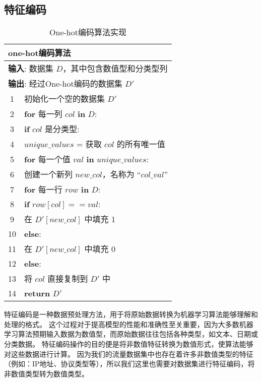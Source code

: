 \subsection{特征编码}
\begin{table}[htbp]
  \caption{One-hot编码算法实现}
  \label{tab:onehot}
  \centering
  \begin{tabularx}{1.0\textwidth}{cl}
  \toprule
  \multicolumn{2}{l}{\textbf{one-hot编码算法}}\\
  \midrule
  \multicolumn{2}{l}{\textbf{输入}: 数据集 $D$，其中包含数值型和分类型列} \\ 
  \multicolumn{2}{l}{\textbf{输出}: 经过One-hot编码的数据集 $D'$} \\
  1& 初始化一个空的数据集 $D'$ \\
  2& \textbf{for} 每一列 $col$ \textbf{in} $D$: \\
  3&\quad \textbf{if} $col$ 是分类型: \\
  4&\quad\quad $unique\_values$ = 获取 $col$ 的所有唯一值 \\
  5&\quad\quad \textbf{for} 每一个值 $val$ \textbf{in} $unique\_values$: \\
  6&\quad\quad\quad 创建一个新列 $new\_col$，名称为 ``$col\_val$''\\
  7&\quad\quad\quad \textbf{for} 每一行 $row$ \textbf{in} $D$: \\
  8&\quad\quad\quad\quad \textbf{if} $row[col] == val$: \\
  9&\quad\quad\quad\quad\quad 在 $D'[new\_col]$ 中填充 1 \\
  10&\quad\quad\quad\quad \textbf{else}: \\
  11&\quad\quad\quad\quad\quad 在 $D'[new\_col]$ 中填充 0 \\
  12&\quad \textbf{else}: \\
  13&\quad\quad 将 $col$ 直接复制到 $D'$ 中 \\
  14&\textbf{return} $D'$ \\ 
  \bottomrule
  \end{tabularx}
  \end{table}
特征编码是一种数据预处理方法，用于将原始数据转换为机器学习算法能够理解和处理的格式。
这个过程对于提高模型的性能和准确性至关重要，因为大多数机器学习算法预期输入数据为数值型，而原始数据往往包括各种类型，如文本、日期或分类数据。
特征编码操作的目的便是将非数值特征转换为数值形式，使算法能够对这些数据进行计算。
因为我们的流量数据集中也存在着许多非数值类型的特征（例如：IP地址、协议类型等），所以我们这里也需要对数据集进行特征编码，将非数值类型转为数值类型。\par


